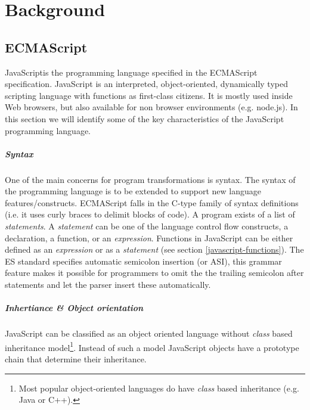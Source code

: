 
\chapter{Background} %

\label{Chapter3}


\section{ECMAScript} \label{javascript}
JavaScript\footnotemark is the programming language specified in the ECMAScript specification\cite{SpecJS}. JavaScript is an interpreted, object-oriented, dynamically typed scripting language with functions as first-class citizens. It is mostly used inside Web browsers, but also available for non browser environments (e.g. node.js). In this section we will identify some of the key characteristics of the JavaScript programming language.

\paragraph{Syntax} \label{javascript-syntax}
One of the main concerns for program transformations is syntax. The syntax of the programming language is to be extended to support new language features/constructs. ECMAScript falls in the C-type family %
of syntax definitions (i.e. it uses curly braces to delimit blocks of code).
A program exists of a list of \textit{statements}. A \textit{statement} can be one of the language control flow constructs, a declaration, a function, or an \textit{expression}. Functions in JavaScript can be either defined as an \textit{expression} or as a \textit{statement} (see section \ref{javascript-functions}). The ES standard specifies automatic semicolon insertion (or ASI), this grammar feature makes it possible for programmers to omit the the trailing semicolon after statements and let the parser insert these automatically.

\paragraph{Inhertiance \& Object orientation} \label{javascript-inheritance}
JavaScript can be classified as an object oriented language without \textit{class} based inheritance model\footnote{Most popular object-oriented languages do have \textit{class} based inheritance (e.g. Java or C++).}. Instead of such a model JavaScript objects have a prototype chain that determine their inheritance.

